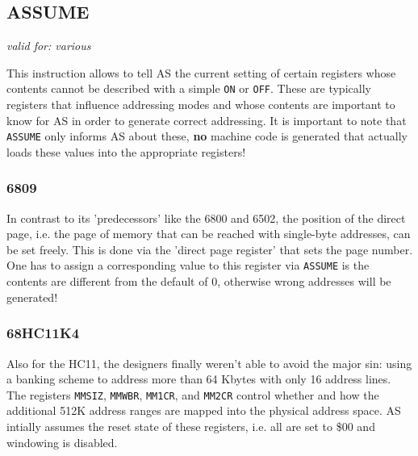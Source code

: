 \documentclass[12pt,twoside]{report}
\makeatletter
\newcommand{\bb}[1]{{\bf #1}}
\newcommand{\tty}[1]{{\tt #1}}
\newcommand{\ttindex}[1]{\index{#1@{\tt #1}}}
\makeatother
\begin{document}

\subsection{ASSUME}
\ttindex{ASSUME}

{\em valid for: various}

This instruction allows to tell AS the current setting of certain
registers whose contents cannot be described with a simple \tty{ON} or
\tty{OFF}.  These are typically registers that influence addressing modes
and whose contents are important to know for AS in order to generate
correct addressing.  It is important to note that \tty{ASSUME} only
informs AS about these, \bb{no} machine code is generated that actually
loads these values into the appropriate registers!


\subsubsection{6809}

In contrast to its 'predecessors' like the 6800 and 6502, the position of
the direct page, i.e. the page of memory that can be reached with
single-byte addresses, can be set freely.  This is done via the 'direct
page register' that sets the page number.  One has to assign a
corresponding value to this register via \tty{ASSUME} is the contents are
different from the default of 0, otherwise wrong addresses will be
generated!


\subsubsection{68HC11K4}

Also for the HC11, the designers finally weren't able to avoid the major
sin: using a banking scheme to address more than 64 Kbytes with only 16
address lines.  The registers {\tt MMSIZ}, {\tt MMWBR}, {\tt MM1CR}, and
{\tt MM2CR} control whether and how the additional 512K address ranges are
mapped into the physical address space.  AS intially assumes the reset
state of these registers, i.e. all are set to \$00 and windowing is
disabled.

\end{document}
